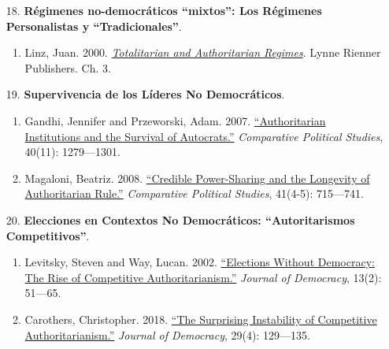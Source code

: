 \documentclass[letterpaper]{article}
\begin{document}
\begin{enumerate}
\begin{enumerate}
        \item[18.] {\bf R\'egimenes no-democr\'aticos ``mixtos'': Los R\'egimenes Personalistas y ``Tradicionales''}.
          \begin{enumerate}
            \item Linz, Juan. 2000. \href{https://github.com/hbahamonde/Ciencia_Politica_I/raw/master/Readings/Linz_2000.pdf}{\emph{Totalitarian and Authoritarian Regimes}}. Lynne Rienner Publishers. Ch. 3.
          \end{enumerate}


				\item[19.] {\bf Supervivencia de los L\'ideres No Democr\'aticos}.
					\begin{enumerate}
						\item Gandhi, Jennifer and Przeworski, Adam. 2007. \href{https://github.com/hbahamonde/Ciencia_Politica_I/raw/master/Readings/Gandhi_Przeworski.pdf}{``Authoritarian Institutions and the Survival of Autocrats.''} \emph{Comparative Political Studies}, 40(11): 1279---1301.
						
						\item Magaloni, Beatriz. 2008. \href{https://github.com/hbahamonde/Ciencia_Politica_I/raw/master/Readings/Magaloni.pdf}{``Credible Power-Sharing and the Longevity of Authoritarian Rule.''} \emph{Comparative Political Studies}, 41(4-5): 715---741.
					\end{enumerate}
				


				\item[20.] {\bf Elecciones en Contextos No Democr\'aticos: ``Autoritarismos Competitivos''}.
					\begin{enumerate}
						\item Levitsky, Steven and Way, Lucan. 2002. \href{https://github.com/hbahamonde/Ciencia_Politica_I/raw/master/Readings/Levitsky_Way.pdf}{``Elections Without Democracy: The Rise of Competitive Authoritarianism.''} \emph{Journal of Democracy}, 13(2): 51---65.
						\item Carothers, Christopher. 2018. \href{https://github.com/hbahamonde/Ciencia_Politica_I/raw/master/Readings/Carothers.pdf}{``The Surprising Instability of Competitive Authoritarianism.''} \emph{Journal of Democracy}, 29(4): 129---135.
					\end{enumerate}





\end{enumerate}
\end{enumerate}
\end{document}
